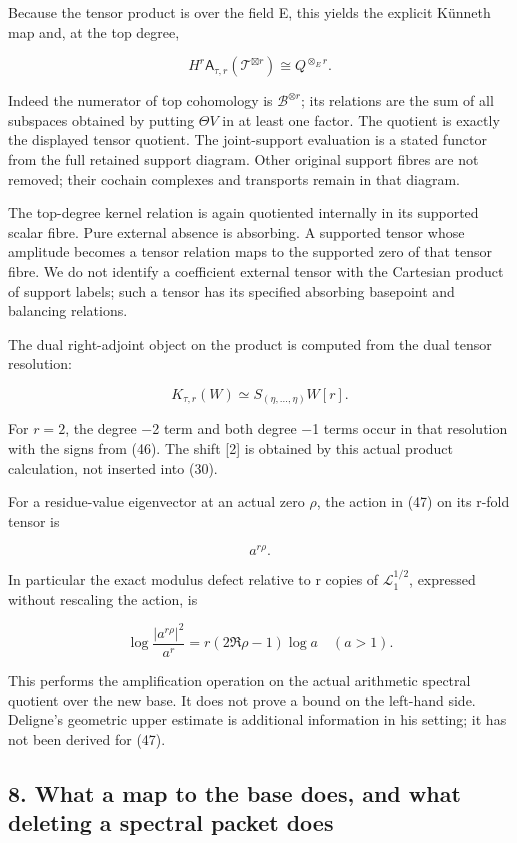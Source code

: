 \documentclass[
]{article}
\begin{document}
Because the tensor product is over the field E, this yields the explicit
Künneth map and, at the top degree,

\[
\boxed{
H^r\mathsf A_{\tau,r}(\mathcal T^{\boxtimes r})\cong Q^{\otimes_E r}.
}
\tag{47}
\]

Indeed the numerator of top cohomology is \(\mathscr B^{\otimes r}\);
its relations are the sum of all subspaces obtained by putting
\(\Theta V\) in at least one factor. The quotient is exactly the
displayed tensor quotient. The joint-support evaluation is a stated
functor from the full retained support diagram. Other original support
fibres are not removed; their cochain complexes and transports remain in
that diagram.

The top-degree kernel relation is again quotiented internally in its
supported scalar fibre. Pure external absence is absorbing. A supported
tensor whose amplitude becomes a tensor relation maps to the supported
zero of that tensor fibre. We do not identify a coefficient external
tensor with the Cartesian product of support labels; such a tensor has
its specified absorbing basepoint and balancing relations.

The dual right-adjoint object on the product is computed from the dual
tensor resolution:

\[
K_{\tau,r}(W)\simeq S_{(\eta,\ldots,\eta)}W[r].
\tag{48}
\]

For \(r=2\), the degree −2 term and both degree −1 terms occur in that
resolution with the signs from (46). The shift {[}2{]} is obtained by
this actual product calculation, not inserted into (30).

For a residue-value eigenvector at an actual zero \(\rho\), the action
in (47) on its r-fold tensor is

\[
a^{r\rho}.
\tag{49}
\]

In particular the exact modulus defect relative to r copies of
\(\mathcal L_1^{1/2}\), expressed without rescaling the action, is

\[
\log\frac{|a^{r\rho}|^2}{a^r}
=r(2\Re\rho-1)\log a\quad(a>1).
\tag{50}
\]

This performs the amplification operation on the actual arithmetic
spectral quotient over the new base. It does not prove a bound on the
left-hand side. Deligne's geometric upper estimate is additional
information in his setting; it has not been derived for (47).

\subsection{8. What a map to the base does, and what deleting a spectral
packet
does}\label{what-a-map-to-the-base-does-and-what-deleting-a-spectral-packet-does}
\end{document}
